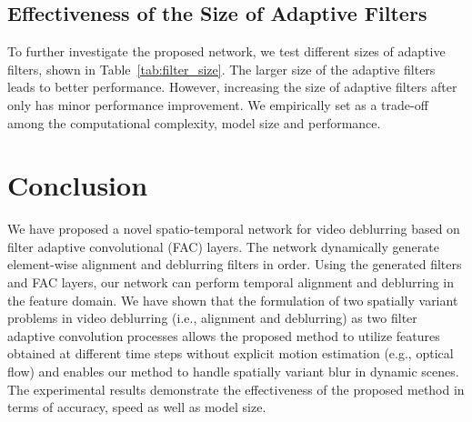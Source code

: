 \documentclass[10pt,twocolumn,letterpaper]{article}
\begin{document}
\subsection{Effectiveness of the Size of Adaptive Filters}\label{sec:filter_size}
To further investigate the proposed network, we test different sizes of adaptive filters, shown in Table~\ref{tab:filter_size}.
The larger size of the adaptive filters leads to better performance.
However, increasing the size of adaptive filters after  only has minor performance improvement.
We empirically set  as a trade-off among the computational complexity, model size and performance.
\section{Conclusion}
We have proposed a novel spatio-temporal network for video deblurring based on filter adaptive convolutional (FAC) layers.
The network dynamically generate element-wise alignment and deblurring filters in order.
Using the generated filters and FAC layers, our network can perform temporal alignment and deblurring in the feature domain.
We have shown that the formulation of two spatially variant problems in video deblurring (i.e., alignment and deblurring) as two filter adaptive convolution processes allows the proposed method to
utilize features obtained at different time steps without explicit motion estimation (e.g., optical flow) and enables our method to handle spatially variant blur in dynamic scenes.
The experimental results demonstrate the effectiveness of the proposed method in terms of accuracy, speed as well as model size.
\clearpage
{\small


}
\end{document}
